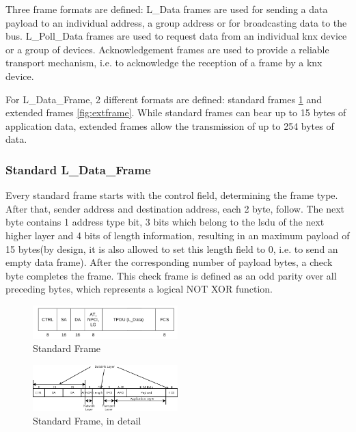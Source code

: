 Three frame formats are defined: L\_Data frames are used for sending a data payload to an individual address, a group address or for broadcasting data to
the bus. L\_Poll\_Data frames are used to request data from an individual knx device or a group of devices. Acknowledgement frames are used to provide a reliable
transport mechanism, i.e. to acknowledge the reception of a frame by a knx device. 

For L\_Data\_Frame, 2 different formats are defined: standard frames \ref{fig:stdframe} and extended frames \ref{fig:extframe}. While standard frames can bear up to
15 bytes of application data, extended frames allow the transmission of up to 254 bytes of data.

\subsubsection{Standard L\_Data\_Frame}

Every standard frame starts with the control field, determining the frame type. 
After that, sender address and destination address, each 2 byte, follow.
The next byte contains 1 address type bit, 3 bits which belong to the \gls{lsdu} of the next higher layer
and 4 bits of length information, resulting in an maximum payload of 15 bytes(by design, it is also allowed to set this length
field to 0, i.e. to send an empty data frame). After the corresponding number of payload bytes, a check byte completes the frame. This check
frame is defined as an odd parity over all preceding bytes, which represents a logical NOT XOR function. 

\begin{figure}
    \centering
    \includegraphics[width=0.5\textwidth]{figures/standardframe.png}
    \caption{Standard Frame}
    \label{fig:stdframe}
\end{figure}

\begin{figure}
    \centering
    \includegraphics[width=0.5\textwidth]{figures/standardFrame.png}
    \caption{Standard Frame, in detail}
    \label{fig:stdFrameDetail}
\end{figure}


